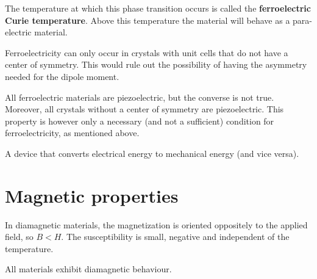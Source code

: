     The temperature at which this phase transition occurs is called the \textbf{ferroelectric Curie temperature}. Above this temperature the material will behave as a para-electric material.

   \begin{remark}
       Ferroelectricity can only occur in crystals with unit cells that do not have a center of symmetry. This would rule out the possibility of having the asymmetry needed for the dipole moment.
   \end{remark}


    \begin{remark}
        All ferroelectric materials are piezoelectric, but the converse is not true. Moreover, all crystals without a center of symmetry are piezoelectric. This property is however only a necessary (and not a sufficient) condition for ferroelectricity, as mentioned above.
    \end{remark}

    \begin{example}[Transducer]
        A device that converts electrical energy to mechanical energy (and vice versa).
    \end{example}

\section{Magnetic properties}

    \begin{definition}[Diamagnetism]
        In diamagnetic materials, the magnetization is oriented oppositely to the applied field, so $B < H$. The susceptibility is small, negative and independent of the temperature.
    \end{definition}
    \begin{remark}
        All materials exhibit diamagnetic behaviour.
    \end{remark}

